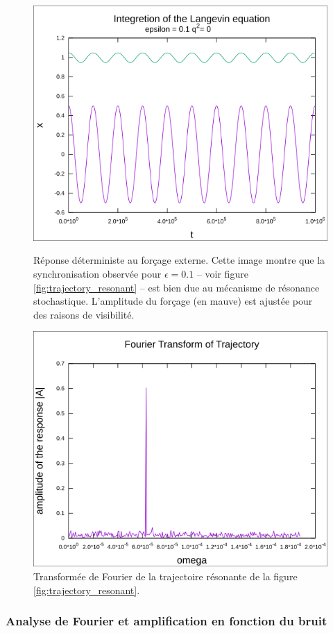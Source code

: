 \begin{figure}[p]
	\centering
	\includegraphics[width=0.8\linewidth]{figures/trajectory_deterministic_small}
	\caption{Réponse déterministe au forçage externe. Cette image montre que la synchronisation observée pour $\epsilon = 0.1$ -- voir figure \ref{fig:trajectory_resonant} -- est bien due au mécanisme de résonance stochastique. L'amplitude du forçage (en mauve) est ajustée pour des raisons de visibilité.}
	\label{fig:trajectory_deterministic_small}

	\includegraphics[width=0.8\linewidth]{figures/spectrum_resonant}
	\caption{Transformée de Fourier de la trajectoire résonante de la figure \ref{fig:trajectory_resonant}.}
	\label{fig:spectrum_resonant}
\end{figure}

\subsubsection{Analyse de Fourier et amplification en fonction du bruit}

